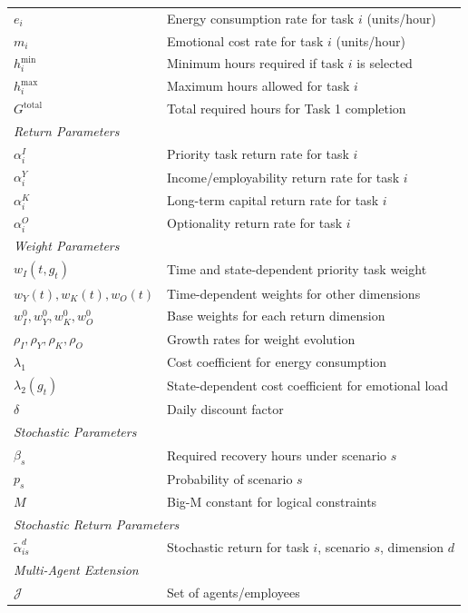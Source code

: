 \documentclass[preprint,review,11pt]{elsarticle}
\begin{document}
\begin{longtable}{ll}
$e_i$ & Energy consumption rate for task $i$ (units/hour) \\
$m_i$ & Emotional cost rate for task $i$ (units/hour) \\
$h_i^{\min}$ & Minimum hours required if task $i$ is selected \\
$h_i^{\max}$ & Maximum hours allowed for task $i$ \\
$G^{\text{total}}$ & Total required hours for Task 1 completion \\
\midrule
\multicolumn{2}{l}{\textit{Return Parameters}} \\
$\alpha_i^I$ & Priority task return rate for task $i$ \\
$\alpha_i^Y$ & Income/employability return rate for task $i$ \\
$\alpha_i^K$ & Long-term capital return rate for task $i$ \\
$\alpha_i^O$ & Optionality return rate for task $i$ \\
\midrule
\multicolumn{2}{l}{\textit{Weight Parameters}} \\
$w_I(t, g_t)$ & Time and state-dependent priority task weight \\
$w_Y(t), w_K(t), w_O(t)$ & Time-dependent weights for other dimensions \\
$w_I^0, w_Y^0, w_K^0, w_O^0$ & Base weights for each return dimension \\
$\rho_I, \rho_Y, \rho_K, \rho_O$ & Growth rates for weight evolution \\
$\lambda_1$ & Cost coefficient for energy consumption \\
$\lambda_2(g_t)$ & State-dependent cost coefficient for emotional load \\
$\delta$ & Daily discount factor \\
\midrule
\multicolumn{2}{l}{\textit{Stochastic Parameters}} \\
$\beta_s$ & Required recovery hours under scenario $s$ \\
$p_s$ & Probability of scenario $s$ \\
$M$ & Big-M constant for logical constraints \\
\midrule
\multicolumn{2}{l}{\textit{Stochastic Return Parameters}} \\
$\tilde{\alpha}_{is}^d$ & Stochastic return for task $i$, scenario $s$, dimension $d$ \\
\midrule
\multicolumn{2}{l}{\textit{Multi-Agent Extension}} \\
$\mathcal{J}$ & Set of agents/employees \\

\end{longtable}
\end{document}
